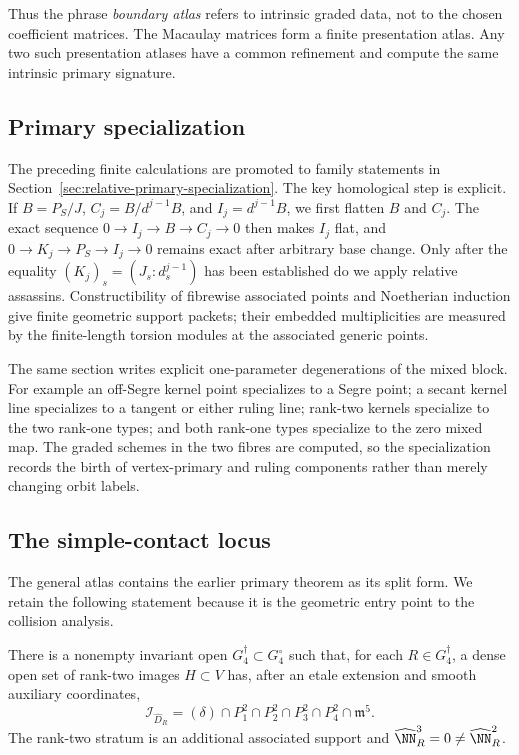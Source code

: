 Thus the phrase \emph{boundary atlas} refers to intrinsic graded
data, not to the chosen coefficient matrices.  The Macaulay matrices
form a finite presentation atlas.  Any two such presentation atlases
have a common refinement and compute the same intrinsic primary
signature.

\subsection{Primary specialization}

The preceding finite calculations are promoted to family statements
in Section~\ref{sec:relative-primary-specialization}.  The key
homological step is explicit.  If \(B=P_S/J\),
\(C_j=B/d^{j-1}B\), and \(I_j=d^{j-1}B\), we first flatten
\(B\) and \(C_j\).  The exact sequence
\(0\to I_j\to B\to C_j\to0\) then makes \(I_j\) flat, and
\(0\to K_j\to P_S\to I_j\to0\) remains exact after arbitrary
base change.  Only after the equality
\((K_j)_s=(J_s:d_s^{j-1})\) has been established do we apply
relative assassins.  Constructibility of fibrewise associated points
and Noetherian induction give finite geometric support packets;
their embedded multiplicities are measured by the finite-length
torsion modules at the associated generic points.

The same section writes explicit one-parameter degenerations of the
mixed block.  For example an off-Segre kernel point specializes to a
Segre point; a secant kernel line specializes to a tangent or either
ruling line; rank-two kernels specialize to the two rank-one types;
and both rank-one types specialize to the zero mixed map.  The
graded schemes in the two fibres are computed, so the specialization
records the birth of vertex-primary and ruling components rather than
merely changing orbit labels.

\subsection{The simple-contact locus}

The general atlas contains the earlier primary theorem as its split
form.  We retain the following statement because it is the geometric
entry point to the collision analysis.

\begin{theorem}
\label{thm:main-coranktwo}
There is a nonempty invariant open
\(G_4^\dagger\subset G_4^\circ\) such that, for each
\(R\in G_4^\dagger\), a dense open set of rank-two images
\(H\subset V\) has, after an etale extension and smooth auxiliary
coordinates,
\begin{equation}\label{eq:main-coranktwo}
 \mathcal I_{\widehat D_R}
 =
 (\delta)\cap P_1^2\cap P_2^2\cap P_3^2\cap P_4^2
 \cap\mathfrak m^5.
\end{equation}
The rank-two stratum is an additional associated support and
\(\widehat\NN_R^3=0\ne\widehat\NN_R^2\).
\end{theorem}


